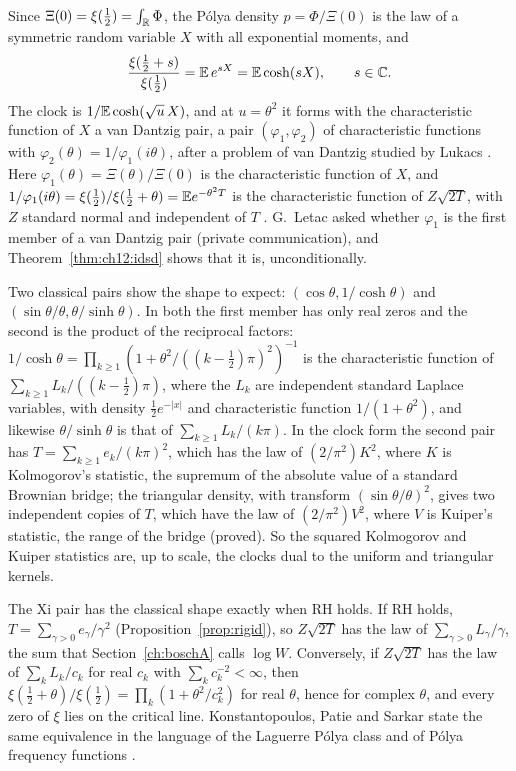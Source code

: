 Since $\Xi(0)=\xi(\frac12)=\int_{\mathbb{R}}\Phi$, the P\'olya density $p=\Phi/\Xi(0)$ is the law of a symmetric random variable $X$ with all exponential moments, and
\begin{equation}\label{eq:ch2:mgf}
\frac{\xi(\frac12+s)}{\xi(\frac12)}=\mathbb{E}\,e^{sX}=\mathbb{E}\cosh(sX),\qquad s\in\mathbb{C} .
\end{equation}
The clock is $1/\mathbb{E}\cosh(\sqrt u\,X)$, and at $u=\theta^2$ it forms with the characteristic function of $X$ a van Dantzig pair, a pair $(\varphi_1,\varphi_2)$ of characteristic functions with $\varphi_2(\theta)=1/\varphi_1(i\theta)$, after a problem of van Dantzig studied by Lukacs \cite{Lukacs68}. Here $\varphi_1(\theta)=\Xi(\theta)/\Xi(0)$ is the characteristic function of $X$, and $1/\varphi_1(i\theta)=\xi(\frac12)/\xi(\frac12+\theta)=\mathbb{E} e^{-\theta^2T}$ is the characteristic function of $Z\sqrt{2T}$, with $Z$ standard normal and independent of $T$ \cite[Theorem A]{P26}. G.~Letac asked whether $\varphi_1$ is the first member of a van Dantzig pair (private communication), and Theorem~\ref{thm:ch12:idsd} shows that it is, unconditionally.

Two classical pairs show the shape to expect: $(\cos\theta,1/\cosh\theta)$ and $(\sin\theta/\theta,\theta/\sinh\theta)$. In both the first member has only real zeros and the second is the product of the reciprocal factors: $1/\cosh\theta=\prod_{k\ge1}(1+\theta^2/((k-\frac12)\pi)^2)^{-1}$ is the characteristic function of $\sum_{k\ge1}L_k/((k-\frac12)\pi)$, where the $L_k$ are independent standard Laplace variables, with density $\frac12e^{-|x|}$ and characteristic function $1/(1+\theta^2)$, and likewise $\theta/\sinh\theta$ is that of $\sum_{k\ge1}L_k/(k\pi)$. In the clock form the second pair has $T=\sum_{k\ge1}e_k/(k\pi)^2$, which has the law of $(2/\pi^2)K^2$, where $K$ is Kolmogorov's statistic, the supremum of the absolute value of a standard Brownian bridge; the triangular density, with transform $(\sin\theta/\theta)^2$, gives two independent copies of $T$, which have the law of $(2/\pi^2)V^2$, where $V$ is Kuiper's statistic, the range of the bridge (proved). So the squared Kolmogorov and Kuiper statistics are, up to scale, the clocks dual to the uniform and triangular kernels.

The Xi pair has the classical shape exactly when RH holds. If RH holds, $T=\sum_{\gamma>0}e_\gamma/\gamma^2$ (Proposition~\ref{prop:rigid}), so $Z\sqrt{2T}$ has the law of $\sum_{\gamma>0}L_\gamma/\gamma$, the sum that Section~\ref{ch:boschA} calls $\log W$. Conversely, if $Z\sqrt{2T}$ has the law of $\sum_kL_k/c_k$ for real $c_k$ with $\sum_kc_k^{-2}<\infty$, then $\xi(\frac12+\theta)/\xi(\frac12)=\prod_k(1+\theta^2/c_k^2)$ for real $\theta$, hence for complex $\theta$, and every zero of $\xi$ lies on the critical line. Konstantopoulos, Patie and Sarkar state the same equivalence in the language of the Laguerre P\'olya class and of P\'olya frequency functions \cite[Theorem 2.3 and Corollary 2.4]{KPS24}.

